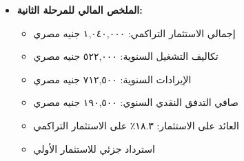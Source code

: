 \begin{itemize}
    \item \textbf{الملخص المالي للمرحلة الثانية:}
    \begin{itemize}
        \item إجمالي الاستثمار التراكمي: ١,٠٤٠,٠٠٠ جنيه مصري
        \item تكاليف التشغيل السنوية: ٥٢٢,٠٠٠ جنيه مصري
        \item الإيرادات السنوية: ٧١٢,٥٠٠ جنيه مصري
        \item صافي التدفق النقدي السنوي: ١٩٠,٥٠٠ جنيه مصري
        \item العائد على الاستثمار: ١٨.٣٪ على الاستثمار التراكمي
        \item استرداد جزئي للاستثمار الأولي
    \end{itemize}
\end{itemize}

